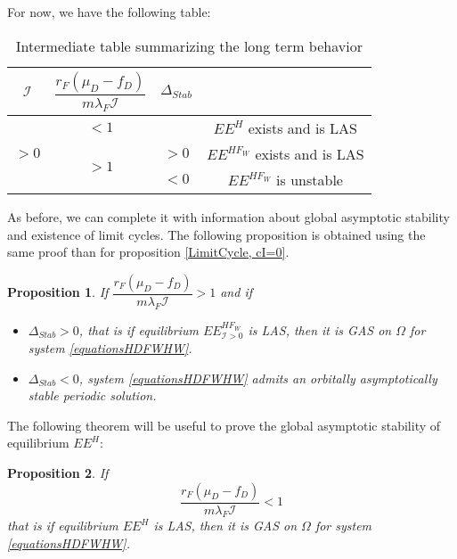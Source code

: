 \documentclass{article}
\newcommand{\lfw}{\lambda_{F}}
\newcommand{\lfw}{\lambda_{F}}
\newcommand{\cI}{\mathcal{I}}
\newtheorem{prop}{Proposition}
\begin{document}
For now, we have the following table:
\begin{table}[ht!]
\def\arraystretch{2}
\centering
\begin{tabular}{c|c|c|c}
$\cI$ & $\dfrac{r_F(\mu_D-f_D)}{m\lfw \cI} $ & $\Delta_{Stab}$ & \\
\hline
\multirow{3}{*}{$>0$} & $<1$ & &$EE^{H}$ exists and is LAS \\
\cline{2-4}
 & \multirow{2}{*}{$> 1$}  & $>0$ &$EE^{HF_W}$ exists and is LAS\\
 \cline{3-4}
 & & $ < 0$ & $EE^{HF_W}$ is unstable \\
\end{tabular}
\caption{Intermediate table summarizing the long term behavior}
\end{table}

As before, we can complete it with information about global asymptotic stability and existence of limit cycles. The following proposition is obtained using the same proof than for proposition \ref{LimitCycle, cI=0}.

\begin{prop}
If $\dfrac{r_F (\mu_D - f_D)}{m \lfw \cI} > 1$ and if 

\begin{itemize}
\item $\Delta_{Stab} > 0$, that is if equilibrium $EE^{HF_W}_{\cI >0}$ is LAS, then it is GAS on $\Omega$ for system \eqref{equationsHDFWHW}.
\item $\Delta_{Stab} < 0$, system \eqref{equationsHDFWHW} admits an orbitally asymptotically stable periodic solution.
\end{itemize}

\end{prop}

The following theorem will be useful to prove the global asymptotic stability of equilibrium $EE^{H}$:

\begin{prop}
If $$\dfrac{r_F(\mu_D-f_D)}{m\lfw \cI} < 1$$
that is if equilibrium $EE^{H}$ is LAS, then it is GAS on $\Omega$ for system \eqref{equationsHDFWHW}.
\end{prop}
\end{document}
